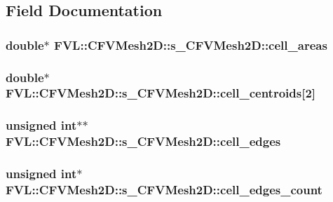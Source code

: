 \subsection{Field Documentation}
\hypertarget{structFVL_1_1CFVMesh2D_1_1s__CFVMesh2D_a9a1f21aa2b9dddf34f776ea755a21064}{
\subsubsection[{cell\_\-areas}]{\setlength{\rightskip}{0pt plus 5cm}double$\ast$ {\bf FVL::CFVMesh2D::s\_\-CFVMesh2D::cell\_\-areas}}}
\label{da/d6f/structFVL_1_1CFVMesh2D_1_1s__CFVMesh2D_a9a1f21aa2b9dddf34f776ea755a21064}
\hypertarget{structFVL_1_1CFVMesh2D_1_1s__CFVMesh2D_a8c79b87f51ced5f0b842fe427a78df74}{
\subsubsection[{cell\_\-centroids}]{\setlength{\rightskip}{0pt plus 5cm}double$\ast$ {\bf FVL::CFVMesh2D::s\_\-CFVMesh2D::cell\_\-centroids}\mbox{[}2\mbox{]}}}
\label{da/d6f/structFVL_1_1CFVMesh2D_1_1s__CFVMesh2D_a8c79b87f51ced5f0b842fe427a78df74}
\hypertarget{structFVL_1_1CFVMesh2D_1_1s__CFVMesh2D_a4ef3d78e05fd966917b46c2736dbdaa2}{
\subsubsection[{cell\_\-edges}]{\setlength{\rightskip}{0pt plus 5cm}unsigned int$\ast$$\ast$ {\bf FVL::CFVMesh2D::s\_\-CFVMesh2D::cell\_\-edges}}}
\label{da/d6f/structFVL_1_1CFVMesh2D_1_1s__CFVMesh2D_a4ef3d78e05fd966917b46c2736dbdaa2}
\hypertarget{structFVL_1_1CFVMesh2D_1_1s__CFVMesh2D_a708e8512deb92f5502d4d30441a9d34e}{
\subsubsection[{cell\_\-edges\_\-count}]{\setlength{\rightskip}{0pt plus 5cm}unsigned int$\ast$ {\bf FVL::CFVMesh2D::s\_\-CFVMesh2D::cell\_\-edges\_\-count}}}

